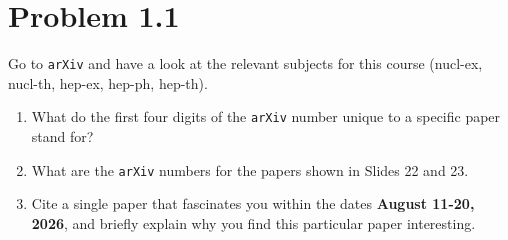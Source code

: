 \documentclass[12pt,a4paper]{article}
\begin{document}
	
	\section*{
		Problem 1.1 
	}
	\begin{problem}
		Go to \texttt{arXiv} and have a look at the relevant subjects 
		for this course (nucl-ex, nucl-th, hep-ex, hep-ph, hep-th).
		\begin{enumerate}
			\item What do the first four digits of the \texttt{arXiv} number 
				  unique to a specific paper stand for?
			  \item What are the \texttt{arXiv} numbers for the papers shown
				  in Slides 22 and 23.
			\item Cite a single paper that fascinates you within the dates
				  \textbf{August 11-20, 2026}, and briefly explain why you
				  find this particular paper interesting.
		\end{enumerate}
	\end{problem}
\end{document}
